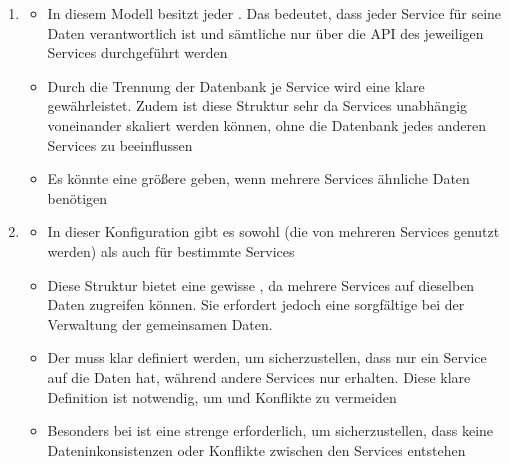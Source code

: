 \begin{infoBox}[title=Datenbankkonfigurationen]
    \begin{enumerate}
        \item {}
        \begin{itemize}
            \item In diesem Modell besitzt jeder . Das bedeutet, dass jeder Service für seine Daten verantwortlich ist und sämtliche  nur über die API des jeweiligen Services durchgeführt werden
            \item {} Durch die Trennung der Datenbank je Service wird eine klare  gewährleistet. Zudem ist diese Struktur sehr  da Services unabhängig voneinander skaliert werden können, ohne die Datenbank jedes anderen Services zu beeinflussen
            \item {} Es könnte eine größere  geben, wenn mehrere Services ähnliche Daten benötigen
        \end{itemize}
        \item {}
        \begin{itemize}
            \item In dieser Konfiguration gibt es sowohl  (die von mehreren Services genutzt werden) als auch  für bestimmte Services
            \item {} Diese Struktur bietet eine gewisse , da mehrere Services auf dieselben Daten zugreifen können. Sie erfordert jedoch eine sorgfältige  bei der Verwaltung der gemeinsamen Daten.
            \item {} Der  muss klar definiert werden, um sicherzustellen, dass nur ein Service  auf die Daten hat, während andere Services nur  erhalten. Diese klare Definition ist notwendig, um  und Konflikte zu vermeiden
            \item {} Besonders bei  ist eine strenge  erforderlich, um sicherzustellen, dass keine Dateninkonsistenzen oder Konflikte zwischen den Services entstehen
        \end{itemize}
    \end{enumerate}
\end{infoBox}
